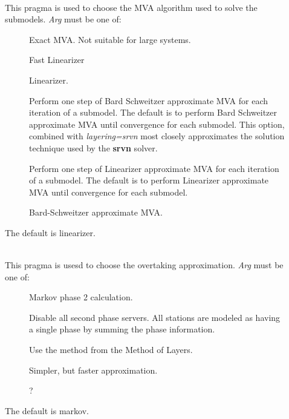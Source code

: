 \begin{description}
\item[]~\\
This pragma is used to choose the MVA algorithm used to solve the submodels.
\emph{Arg} must be one of: 
\begin{description}
\item[]
Exact MVA.  Not suitable for large systems.
\item[]
Fast Linearizer
\item[]
Linearizer.
\item[]
Perform one step of Bard Schweitzer approximate MVA for each iteration of a submodel.  The default is to perform Bard Schweitzer approximate MVA until convergence for each submodel.  This option, combined with \emph{layering=srvn} most closely approximates the solution technique used by the \textbf{srvn} solver.
\item[]
Perform one step of Linearizer approximate MVA for each iteration of a submodel.  The default is to perform Linearizer approximate MVA until convergence for each submodel.
\item[]
Bard-Schweitzer approximate MVA.
\end{description}
The default is linearizer.
\item[]~\\
This pragma is usesd to choose the overtaking approximation.
\emph{Arg} must be one of: 
\begin{description}
\item[]
Markov phase 2 calculation.
\item[]
Disable all second phase servers.  All stations are modeled as having a single phase by summing the phase information.
\item[]
Use the method from the Method of Layers.
\item[]
Simpler, but faster approximation.
\item[]
?
\end{description}
The default is markov.
\item[]~\\

\end{description}
